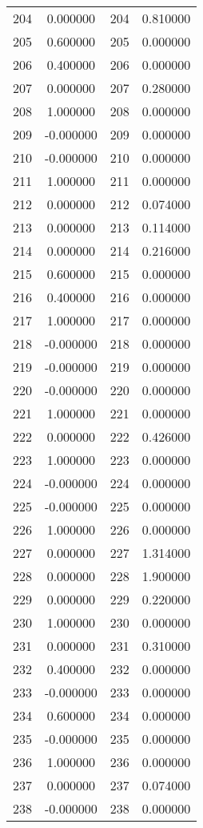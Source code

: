 \documentclass[12pt]{article}
\begin{document}
\begin{longtable}{@{}cccc@{}}
204 & 0.000000 & 204 & 0.810000 \\
205 & 0.600000 & 205 & 0.000000 \\
206 & 0.400000 & 206 & 0.000000 \\
207 & 0.000000 & 207 & 0.280000 \\
208 & 1.000000 & 208 & 0.000000 \\
209 & -0.000000 & 209 & 0.000000 \\
210 & -0.000000 & 210 & 0.000000 \\
211 & 1.000000 & 211 & 0.000000 \\
212 & 0.000000 & 212 & 0.074000 \\
213 & 0.000000 & 213 & 0.114000 \\
214 & 0.000000 & 214 & 0.216000 \\
215 & 0.600000 & 215 & 0.000000 \\
216 & 0.400000 & 216 & 0.000000 \\
217 & 1.000000 & 217 & 0.000000 \\
218 & -0.000000 & 218 & 0.000000 \\
219 & -0.000000 & 219 & 0.000000 \\
220 & -0.000000 & 220 & 0.000000 \\
221 & 1.000000 & 221 & 0.000000 \\
222 & 0.000000 & 222 & 0.426000 \\
223 & 1.000000 & 223 & 0.000000 \\
224 & -0.000000 & 224 & 0.000000 \\
225 & -0.000000 & 225 & 0.000000 \\
226 & 1.000000 & 226 & 0.000000 \\
227 & 0.000000 & 227 & 1.314000 \\
228 & 0.000000 & 228 & 1.900000 \\
229 & 0.000000 & 229 & 0.220000 \\
230 & 1.000000 & 230 & 0.000000 \\
231 & 0.000000 & 231 & 0.310000 \\
232 & 0.400000 & 232 & 0.000000 \\
233 & -0.000000 & 233 & 0.000000 \\
234 & 0.600000 & 234 & 0.000000 \\
235 & -0.000000 & 235 & 0.000000 \\
236 & 1.000000 & 236 & 0.000000 \\
237 & 0.000000 & 237 & 0.074000 \\
238 & -0.000000 & 238 & 0.000000 \\

\end{longtable}
\end{document}
